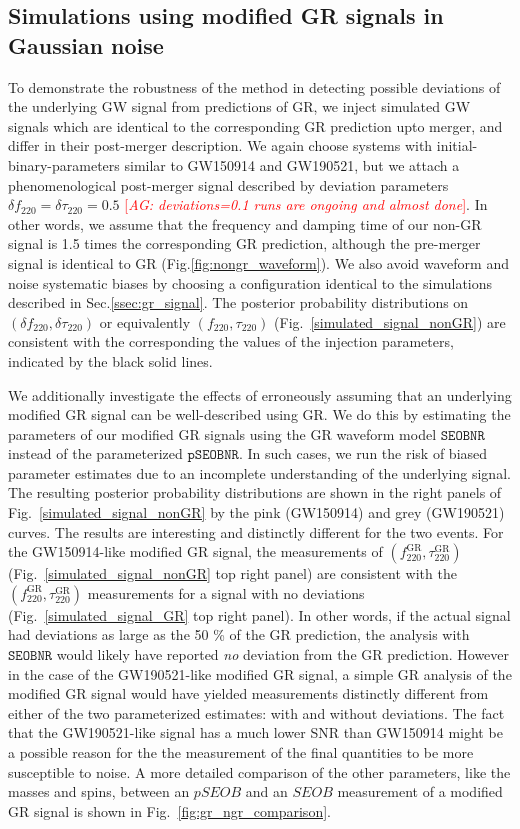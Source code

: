 \documentclass[twocolumn,prd,aps,superscriptaddress,preprintnumbers,tightenlines,showpacs,nofootinbib,eqsecnum,amsfonts,amsmath]{revtex4-1}
\newcommand{\abhi}[1]{\textcolor{red}{[\textit{AG: #1}]}}
\newcommand{\df}[1]{\delta f_{\text{#1}}}
\newcommand{\dtau}[1]{\delta \tau_{\text{#1}}}
\newcommand{\fngr}[1]{f_{\text{#1}}}
\newcommand{\taungr}[1]{\tau_{\text{#1}}}
\newcommand{\fgr}[1]{f ^{\text{GR}}_{\text{#1}}}
\newcommand{\taugr}[1]{\tau ^{\text{GR}}_{\text{#1}}}
\newcommand{\pSEOB}{\texttt{pSEOBNR}}
\newcommand{\SEOB}{\texttt{SEOBNR}}
\begin{document}
\subsection{Simulations using modified GR signals in Gaussian noise}

To demonstrate the robustness of the method in detecting possible deviations of the underlying GW signal from predictions of GR, we inject simulated GW signals which are identical to the corresponding GR prediction upto merger, and differ in their post-merger description. We again choose systems with initial-binary-parameters similar to GW150914 and GW190521, but we attach a phenomenological post-merger signal described by deviation parameters $\df{220} = \dtau{220} = 0.5$ \abhi{deviations=0.1 runs are ongoing and almost done}. In other words, we assume that the frequency and damping time of our non-GR signal is 1.5 times the corresponding GR prediction, although the pre-merger signal is identical to GR (Fig.\ref{fig:nongr_waveform}). We also avoid waveform and noise systematic biases by choosing a configuration identical to the simulations described in Sec.\ref{ssec:gr_signal}. The posterior probability distributions on $(\df{220}, \dtau{220})$ or equivalently $(\fngr{220}, \taungr{220})$ (Fig.~\ref{simulated_signal_nonGR}) are consistent with the corresponding the values of the injection parameters, indicated by the black solid lines. 

We additionally investigate the effects of erroneously assuming that an underlying modified GR signal can be well-described using GR. We do this by estimating the parameters of our modified GR signals using the GR waveform model $\SEOB$ instead of the parameterized $\pSEOB$. In such cases, we run the risk of biased parameter estimates due to an incomplete understanding of the underlying signal. The resulting posterior probability distributions are shown in the right panels of Fig.~\ref{simulated_signal_nonGR} by the pink (GW150914) and grey (GW190521) curves. The results are interesting and distinctly different for the two events. For the GW150914-like modified GR signal, the measurements of $(\fgr{220}, \taugr{220})$ (Fig.~\ref{simulated_signal_nonGR} top right panel) are consistent with the $(\fgr{220}, \taugr{220})$ measurements for a signal with no deviations (Fig.~\ref{simulated_signal_GR} top right panel). In other words, if the actual signal had deviations as large as the 50 \% of the GR prediction, the analysis with $\SEOB$ would likely have reported \emph{no} deviation from the GR prediction. However in the case of the GW190521-like modified GR signal, a simple GR analysis of the modified GR signal would have yielded measurements distinctly different from either of the two parameterized estimates: with and without deviations. The fact that the GW190521-like signal has a much lower SNR than GW150914 might be a possible reason for the the measurement of the final quantities to be more susceptible to noise. A more detailed comparison of the other parameters, like the masses and spins, between an $pSEOB$ and an $SEOB$ measurement of a modified GR signal is shown in Fig.~\ref{fig:gr_ngr_comparison}.
\end{document}

